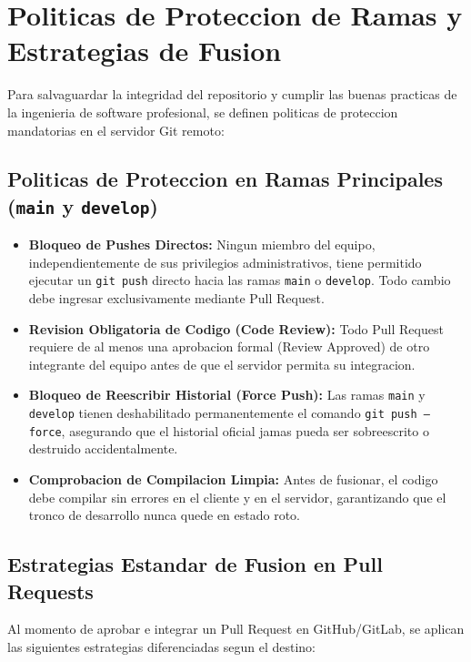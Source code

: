 \documentclass[12pt,a4paper]{report}
\begin{document}
\newpage
\chapter{Politicas de Proteccion de Ramas y Estrategias de Fusion}

Para salvaguardar la integridad del repositorio y cumplir las buenas practicas de la ingenieria de software profesional, se definen politicas de proteccion mandatorias en el servidor Git remoto:

\section{Politicas de Proteccion en Ramas Principales (\texttt{main} y \texttt{develop})}
\begin{itemize}
  \item \textbf{Bloqueo de Pushes Directos:} Ningun miembro del equipo, independientemente de sus privilegios administrativos, tiene permitido ejecutar un \texttt{git push} directo hacia las ramas \texttt{main} o \texttt{develop}. Todo cambio debe ingresar exclusivamente mediante Pull Request.
  \item \textbf{Revision Obligatoria de Codigo (Code Review):} Todo Pull Request requiere de al menos una aprobacion formal (Review Approved) de otro integrante del equipo antes de que el servidor permita su integracion.
  \item \textbf{Bloqueo de Reescribir Historial (Force Push):} Las ramas \texttt{main} y \texttt{develop} tienen deshabilitado permanentemente el comando \texttt{git push --force}, asegurando que el historial oficial jamas pueda ser sobreescrito o destruido accidentalmente.
  \item \textbf{Comprobacion de Compilacion Limpia:} Antes de fusionar, el codigo debe compilar sin errores en el cliente y en el servidor, garantizando que el tronco de desarrollo nunca quede en estado roto.
\end{itemize}

\section{Estrategias Estandar de Fusion en Pull Requests}
Al momento de aprobar e integrar un Pull Request en GitHub/GitLab, se aplican las siguientes estrategias diferenciadas segun el destino:
\end{document}
